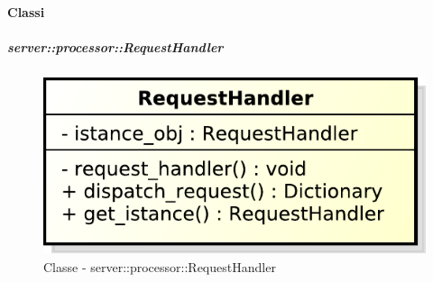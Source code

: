   \paragraph{Classi} %

\subparagraph{server::processor::RequestHandler} %
    \label{subp:bdsm_app_server_processor_requesthandler}
    \begin{figure}[!htbp]
  		\centering
 		\centerline{\includegraphics[scale=0.75]{./images/server/classes/processor/request_handler.pdf}}
 		\caption{Classe - server::processor::RequestHandler}
	\end{figure}
